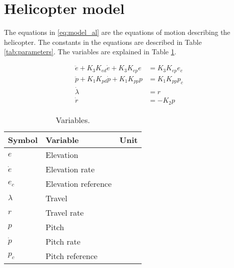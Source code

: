 \appendix


\section{Helicopter model}\label{sec:helimodel}

The equations in \ref{eq:model_al} are the equations of motion describing the helicopter. The constants in the equations are described in Table \ref{tab:parameters}. The variables are explained in Table \ref{tab:variables}.

\begin{subequations}\label{eq:model_al}
	\begin{align}
		\ddot{e} + K_{3} K_{ed} \dot{e} + K_{3} K_{ep} e &= K_{3} K_{ep} e_{c} \label{eq:model_se_al_elev} \\
		\ddot{p} + K_{1} K_{pd} \dot{p} + K_{1} K_{pp} p &= K_{1} K_{pp} p_{c} \label{eq:model_se_al_pitch} \\
		\dot{\lambda} &= r \label{eq:model_se_al_lambda} \\
		\dot{r} &= -K_{2} p \label{eq:model_se_al_r} 
	\end{align}
\end{subequations}


\begin{table}[tbp]
	\centering
	\caption{Variables.}
	\begin{tabular}{lll}
		\toprule
		Symbol & Variable & Unit \\
		\midrule
		$e$ & Elevation & \radian\\
		$\dot e$ & Elevation rate & \radian\per\second\\
		$e_c$ & Elevation reference & \radian\\
		$\lambda$ & Travel & \radian\\
		$r$ & Travel rate & \radian\per\second\\
		$p$ & Pitch & \radian\\
		$\dot p$ & Pitch rate & \radian\per\second\\
		$p_c$ & Pitch reference & \radian\\
		\bottomrule
	\end{tabular}
\label{tab:variables}
\end{table}

